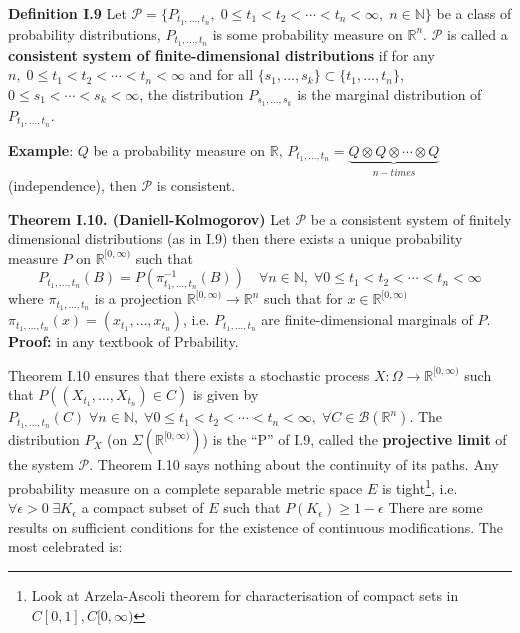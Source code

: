 \documentclass[english]{article}
\newcommand{\R}{\mathbb{R}}
\newcommand{\N}{\mathbb{N}}
\newcommand{\ub}{\underbrace}
\newcommand{\note}[1]{\noindent\textbf{#1}}
\newcommand{\B}{\mathcal B}
\begin{document}
\note{Definition I.9} Let $\mathcal P = \{P_{t_1,\dots, t_n},\; 0\leq t_1 < t_2 < \cdots < t_n < \infty,\; n\in \N\}$ be a class of probability distributions, $P_{t_1,\dots, t_n}$ is some probability measure on $\R^n$. $\mathcal P$ is called a \textbf{consistent system of finite-dimensional distributions} if for any $n,\; 0\leq t_1<t_2 < \cdots < t_n < \infty$ and for all $\{s_1,\dots, s_k\}\subset \{t_1, \dots, t_n\}$, $0\leq s_1 < \cdots < s_k < \infty$, the distribution $P_{s_1,\dots, s_k}$ is the marginal distribution of $P_{t_1, \dots, t_n}$.\newline

\note{Example}: $Q$ be a probability measure on $\R$, $P_{t_1,\dots, t_n} = \ub{Q\otimes Q \otimes \cdots \otimes Q}_{n-times}$ (independence), then $\mathcal P$ is consistent.\newline

\note{Theorem I.10. (Daniell-Kolmogorov)} Let $\mathcal P$ be a consistent system of finitely dimensional distributions (as in I.9) then there exists a unique probability measure $P$ on $\R^{[0,\infty)}$ such that 
$$P_{t_1,\dots, t_n} (B) = P(\pi^{-1}_{t_1,\dots, t_n}(B)) \quad \forall n\in \N,\; \forall 0\leq t_1<t_2<\cdots <t_n < \infty$$
where $\pi_{t_1,\dots, t_n}$ is a projection $\R^{[0,\infty)} \to \R^n$ such that for $x\in \R^{[0,\infty)}$ $\pi_{t_1, \dots, t_n}(x) = (x_{t_1},\dots , x_{t_n})$, i.e. $P_{t_1,\dots, t_n}$  are finite-dimensional marginals of $P$.  \newline
\textbf{Proof:} in any textbook of Prbability.\newline

Theorem I.10 ensures that there exists a stochastic process $X: \Omega \to \R^{[0,\infty)}$ such that $P((X_{t_1}, \dots, X_{t_n}) \in C)$ is given by $P_{t_1,\dots, t_n}(C) \; \forall n\in \N,\; \forall 0\leq t_1 < t_2 < \cdots <t_n < \infty,\; \forall C \in \B(\R^n)$. The distribution $P_X$ (on $\Sigma(\R^{[0,\infty)})$) is the ``P'' of I.9, called the \textbf{projective limit} of the system $\mathcal P$. \newline
Theorem I.10 says nothing about the continuity of its paths.\newline
Any probability measure on a complete separable metric space $E$ is tight\footnote{Look at Arzela-Ascoli theorem for characterisation of compact sets in $C[0,1], C[0,\infty)$}, i.e. $\forall \epsilon > 0\; \exists K_\epsilon$ a compact subset of $E$ such that $P(K_\epsilon) \geq 1-\epsilon$ \newline
There are some results on sufficient conditions for the existence of continuous modifications. The most celebrated is:\newline
\end{document}
